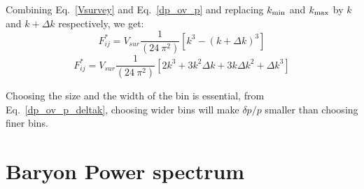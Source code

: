 \documentclass[10pt,a4paper]{article}
\begin{document}
Combining Eq.~\ref{Vsurvey} and Eq.~\ref{dp_ov_p}  and replacing $k_{\rm min}$ and $k_{\rm max}$ by $k$ and $k+ \Delta k$ respectively, we get:
\begin{equation}\label{dp_ov_p}
F_{ij}^*= V_{sur} \frac{1}{ (24 \ \pi^2 )} \left[ k^3 -(k+ \Delta k) ^3 \right]
\end{equation}
\begin{equation}\label{dp_ov_p_deltak}
F_{ij}^*= V_{sur} \frac{1}{ (24 \ \pi^2 )} \left[ 2 k^3 + 3k^2  \Delta k  + 3 k \Delta k^2 + \Delta k^3 \right]
\end{equation}

Choosing the size and the width of the bin is essential, from Eq.~\ref{dp_ov_p_deltak}, choosing wider bins will make $\delta p/p$ smaller than choosing finer bins.

\section{Baryon Power spectrum}
\end{document}
